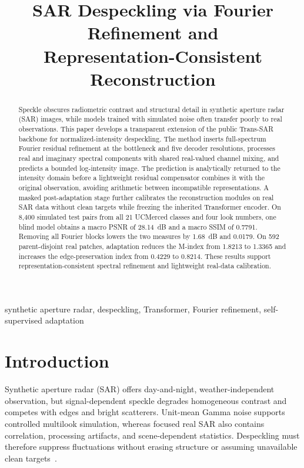 \documentclass[conference]{IEEEtran}
\begin{document}
\title{SAR Despeckling via Fourier Refinement and\\
Representation-Consistent Reconstruction}

\author{}

\maketitle

\begin{abstract}
Speckle obscures radiometric contrast and structural detail in synthetic aperture radar (SAR) images, while models trained with simulated noise often transfer poorly to real observations. This paper develops a transparent extension of the public Trans-SAR backbone for normalized-intensity despeckling. The method inserts full-spectrum Fourier residual refinement at the bottleneck and five decoder resolutions, processes real and imaginary spectral components with shared real-valued channel mixing, and predicts a bounded log-intensity image. The prediction is analytically returned to the intensity domain before a lightweight residual compensator combines it with the original observation, avoiding arithmetic between incompatible representations. A masked post-adaptation stage further calibrates the reconstruction modules on real SAR data without clean targets while freezing the inherited Transformer encoder. On 8,400 simulated test pairs from all 21 UCMerced classes and four look numbers, one blind model obtains a macro PSNR of 28.14~dB and a macro SSIM of 0.7791. Removing all Fourier blocks lowers the two measures by 1.68~dB and 0.0179. On 592 parent-disjoint real patches, adaptation reduces the M-index from 1.8213 to 1.3365 and increases the edge-preservation index from 0.4229 to 0.8214. These results support representation-consistent spectral refinement and lightweight real-data calibration.
\end{abstract}

\begin{IEEEkeywords}
synthetic aperture radar, despeckling, Transformer, Fourier refinement, self-supervised adaptation
\end{IEEEkeywords}

\section{Introduction}
Synthetic aperture radar (SAR) offers day-and-night, weath\-er-independent observation, but signal-dependent speckle degrades homogeneous contrast and competes with edges and bright scatterers. Unit-mean Gamma noise supports controlled multilook simulation, whereas focused real SAR also contains correlation, processing artifacts, and scene-dependent statistics. Despeckling must therefore suppress fluctuations without erasing structure or assuming unavailable clean targets~\cite{fracastoro2021overview}.
\end{document}

